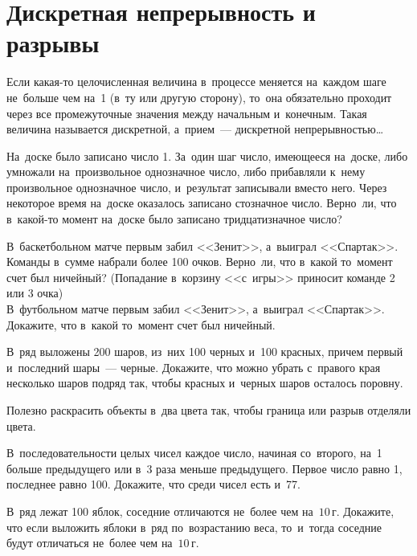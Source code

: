 
\section*{Дискретная непрерывность и разрывы}



Если какая-то целочисленная величина в~процессе меняется на~каждом шаге
не~больше чем на~1 (в~ту или другую сторону), то~она обязательно проходит через
все промежуточные значения между начальным и~конечным.
Такая величина называется дискретной, а~прием~---
дискретной непрерывностью\ldots

\begin{problems}

\item
На~доске было записано число 1.
За~один шаг число, имеющееся на~доске, либо умножали на~произвольное
однозначное число, либо прибавляли к~нему произвольное однозначное число,
и~результат записывали вместо него.
Через некоторое время на~доске оказалось записано стозначное число.
Верно~ли, что в~какой-то момент на~доске было записано тридцатизначное число?

\item
\sp
В~баскетбольном матче первым забил <<Зенит>>, а~выиграл <<Спартак>>.
Команды в~сумме набрали более 100 очков.
Верно~ли, что в~какой то~момент счет был ничейный?
(Попадание в~корзину <<с~игры>> приносит команде 2 или 3 очка)
\\
\sp
В~футбольном матче первым забил <<Зенит>>, а~выиграл <<Спартак>>.
Докажите, что в~какой то~момент счет был ничейный.

\item
В~ряд выложены 200 шаров, из~них 100 черных и~100 красных, причем первый
и~последний шары~--- черные.
Докажите, что можно убрать с~правого края несколько шаров подряд так, чтобы
красных и~черных шаров осталось поровну.

\end{problems}

Полезно раскрасить объекты в~два цвета так, чтобы граница или разрыв отделяли
цвета.

\begin{problems}

\item
В~последовательности целых чисел каждое число, начиная со~второго, на~1 больше
предыдущего или в~3 раза меньше предыдущего.
Первое число равно 1, последнее равно 100.
Докажите, что среди чисел есть и~77.

\item
В~ряд лежат 100 яблок, соседние отличаются не~более чем на~$10\,\text{г}$.
Докажите, что если выложить яблоки в~ряд по~возрастанию веса, то~и~тогда
соседние будут отличаться не~более чем на~$10\,\text{г}$.

\end{problems}

